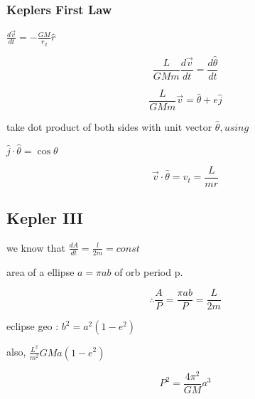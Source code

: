 \documentclass{article}
\begin{document}
\subsubsection{Keplers First Law}
\begin{list}{-}{}
\item $\frac{d\vec{v}}{dt} = -\frac{GM}{r_2}\hat{r}$
\item \[\frac{L}{GMm} \frac{d\vec{v}}{dt} = \frac{d\hat{\theta}}{dt}\]
\item \[\frac{L}{GMm}\vec{v} = \hat{\theta} + e\hat{j}\]
\item take dot product of both sides with unit vector $\hat{\theta}, using$
\item $\hat{j}\cdot\hat{\theta} = \cos\theta$
\item \[\vec{v} \cdot \hat{\theta} = v_t = \frac{L}{mr}\]
\end{list}

\subsection{Kepler III}

\begin{list}{-}{}
\item we know that $\frac{dA}{dt} = \frac{l}{2m} = const$
\item area of a ellipse $a =\pi ab$ of orb period p.
\item \[\therefore \frac{A}{P} = \frac{\pi ab}{P} = \frac{L}{2m}\]
\item eclipse geo : $b^2 = a^2(1-e^2)$
\item also, $\frac{L^2}{m^2} GMa(1-e^2)$
\item \[P^2 = \frac{4\pi^2}{GM}a^3\]
\end{list}
\end{document}

